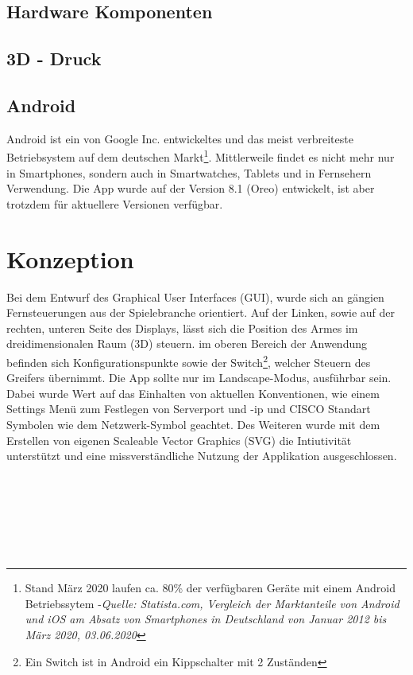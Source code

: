 \documentclass[12pt,					%
							 oneside,			%
							 a4paper,			%
							 halfparskip,		%
							 liststotoc,			%
							 bibtotoc,			%
							 fleqn,				%
							 pointlessnumbers]	%
							 {scrreprt}
\begin{document}
\section{Hardware Komponenten}
\section{3D - Druck}
\section{Android}
Android ist ein von Google Inc. entwickeltes und das meist verbreiteste Betriebsystem auf dem deutschen Markt\footnote{Stand März 2020 laufen ca. 80\% der verfügbaren Geräte mit einem Android Betriebssytem -\textit{Quelle: Statista.com, \glqq{}Vergleich der Marktanteile von Android und iOS am Absatz von Smartphones in Deutschland von Januar 2012 bis März 2020\grqq{}, 03.06.2020}\cite{Tenzer2020}}. Mittlerweile findet es nicht mehr nur in Smartphones, sondern auch in Smartwatches, Tablets und in Fernsehern Verwendung. Die App wurde auf der Version 8.1 (Oreo) entwickelt, ist aber trotzdem für aktuellere Versionen verfügbar.
\chapter{Konzeption}
Bei dem Entwurf des Graphical User Interfaces (GUI), wurde sich an gängien Fernsteuerungen aus der Spielebranche orientiert. Auf der Linken, sowie auf der rechten, unteren Seite des Displays, lässt sich die Position des Armes im dreidimensionalen Raum (3D) steuern. im oberen Bereich der Anwendung befinden sich Konfigurationspunkte sowie der \glqq{}Switch\grqq{}\footnote{Ein Switch ist in Android ein Kippschalter mit 2 Zuständen}, welcher Steuern des Greifers übernimmt. Die App sollte nur im \glqq{}Landscape\grqq{}-Modus, ausführbar sein. Dabei wurde Wert auf das Einhalten von aktuellen Konventionen, wie einem Settings Menü zum Festlegen von Serverport und -ip und CISCO Standart Symbolen wie dem Netzwerk-Symbol geachtet. Des Weiteren wurde mit dem Erstellen von eigenen Scaleable Vector Graphics (SVG) die Intiutivität unterstützt und eine missverständliche Nutzung der Applikation ausgeschlossen.\\ \\ \\ \\ \\ \\ \\
\end{document}
